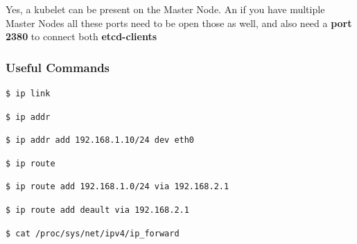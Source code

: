 \documentclass{article}
\newenvironment{blocktemplate}[1]{%
    \tcolorbox[beamer,%
    noparskip,breakable,
    colframe=Blue,%
    colbacklower=LimeGreen!75!LightGreen,%
    title=#1]}%
    {\endtcolorbox}
\newenvironment{codetemplate}[1][]{%
  \mybasecolorbox[#1]
  \itshape
}{%
  \endmybasecolorbox
}
\begin{document}
\begin{blocktemplate}{NOTE}
Yes, a kubelet can be present on the Master Node. An if you have multiple Master Nodes all these ports need to be open those as well, and also need a \textbf{port 2380} to connect both \textbf{etcd-clients}
\end{blocktemplate}

\subsubsection{Useful Commands}

\begin{codetemplate}{}
\begin{verbatim}
$ ip link
\end{verbatim}
\end{codetemplate}

\begin{codetemplate}{}
\begin{verbatim}
$ ip addr
\end{verbatim}
\end{codetemplate}

\begin{codetemplate}{}
\begin{verbatim}
$ ip addr add 192.168.1.10/24 dev eth0
\end{verbatim}
\end{codetemplate}

\begin{codetemplate}{}
\begin{verbatim}
$ ip route
\end{verbatim}
\end{codetemplate}

\begin{codetemplate}{}
\begin{verbatim}
$ ip route add 192.168.1.0/24 via 192.168.2.1
\end{verbatim}
\end{codetemplate}

\begin{codetemplate}{}
\begin{verbatim}
$ ip route add deault via 192.168.2.1
\end{verbatim}
\end{codetemplate}

\begin{codetemplate}{}
\begin{verbatim}
$ cat /proc/sys/net/ipv4/ip_forward
\end{verbatim}
\end{codetemplate}
\end{document}
